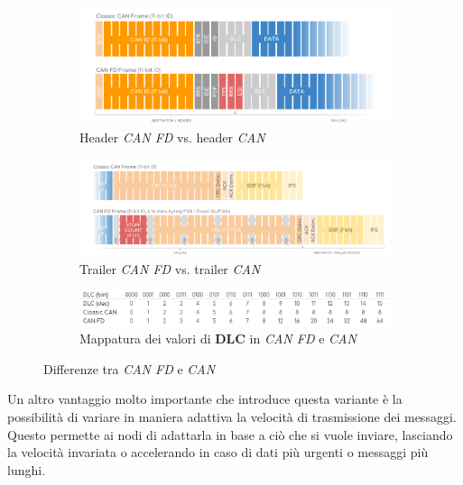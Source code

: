 \begin{figure}[h]
    \begin{subfigure}{0.45\textwidth}
        \includegraphics[width=1\textwidth]{capitoli/figure-protocolli/canfd-header.png}
        \caption{Header \emph{CAN FD} vs. header \emph{CAN}}
        \label{fig:canfd-header}
    \end{subfigure}
    \hfill
    \begin{subfigure}{0.45\textwidth}
        \includegraphics[width=1\textwidth]{capitoli/figure-protocolli/canfd-trailer.png}
        \caption{Trailer \emph{CAN FD} vs. trailer \emph{CAN}}
        \label{fig:canfd-trailer}
    \end{subfigure}
    \centering
    \begin{subfigure}{0.8\textwidth}
        \vspace{0.3cm}
        \includegraphics[width=1\textwidth]{capitoli/figure-protocolli/canfd-dlc.png}
        \caption{Mappatura dei valori di \textbf{DLC} in \emph{CAN FD} e \emph{CAN}}
        \label{fig:canfd-dlc}
    \end{subfigure}
    \caption{Differenze tra \emph{CAN FD} e \emph{CAN}}
    \label{fig:canfd-differences}
\end{figure}

Un altro vantaggio molto importante che introduce questa variante è la possibilità di variare in maniera adattiva la velocità di trasmissione dei messaggi. Questo permette ai nodi di adattarla in base a ciò che si vuole inviare, lasciando la velocità invariata o accelerando in caso di dati più urgenti o messaggi più lunghi.

